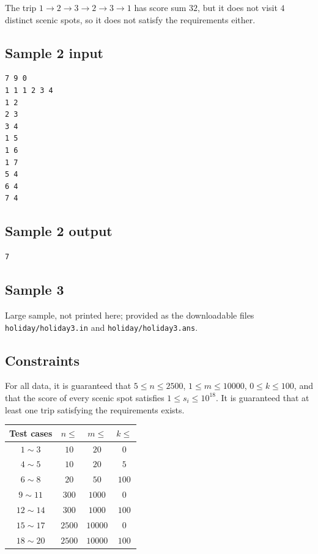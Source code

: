 \documentclass[11pt]{article}
\begin{document}
The trip $1 \to 2 \to 3 \to 2 \to 3 \to 1$ has score sum $32$,
but it does not visit $4$ distinct scenic spots,
so it does not satisfy the requirements either.

\subsection*{Sample 2 input}

\begin{verbatim}
7 9 0
1 1 1 2 3 4
1 2
2 3
3 4
1 5
1 6
1 7
5 4
6 4
7 4
\end{verbatim}

\subsection*{Sample 2 output}

\begin{verbatim}
7
\end{verbatim}

\subsection*{Sample 3}

Large sample, not printed here;
provided as the downloadable files \texttt{holiday/holiday3.in} and \texttt{holiday/holiday3.ans}.

\subsection*{Constraints}

For all data, it is guaranteed that $5 \le n \le 2500$,
$1 \le m \le 10000$,
$0 \le k \le 100$,
and that the score of every scenic spot satisfies $1 \le s_i \le 10^{18}$.
It is guaranteed that at least one trip satisfying the requirements exists.

\begin{center}
\begin{tabular}{cccc}
\toprule
Test cases & $n \le$ & $m \le$ & $k \le$ \\
\midrule
$1 \sim 3$ & $10$ & $20$ & $0$ \\
$4 \sim 5$ & $10$ & $20$ & $5$ \\
$6 \sim 8$ & $20$ & $50$ & $100$ \\
$9 \sim 11$ & $300$ & $1000$ & $0$ \\
$12 \sim 14$ & $300$ & $1000$ & $100$ \\
$15 \sim 17$ & $2500$ & $10000$ & $0$ \\
$18 \sim 20$ & $2500$ & $10000$ & $100$ \\
\bottomrule
\end{tabular}
\end{center}
\end{document}
